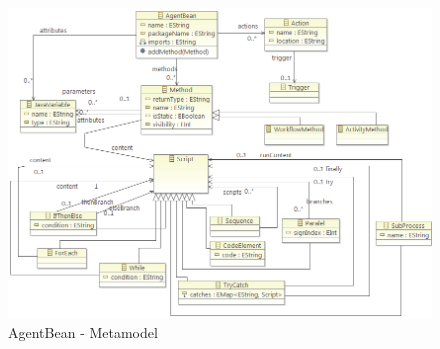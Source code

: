 \begin{figure}[h]
	\centering		\includegraphics[width=1.0\textwidth]{images/agentBean_metamodel.png}
	\caption{AgentBean - Metamodel}
	\label{fig:agentbean_metamodel}
\end{figure}

